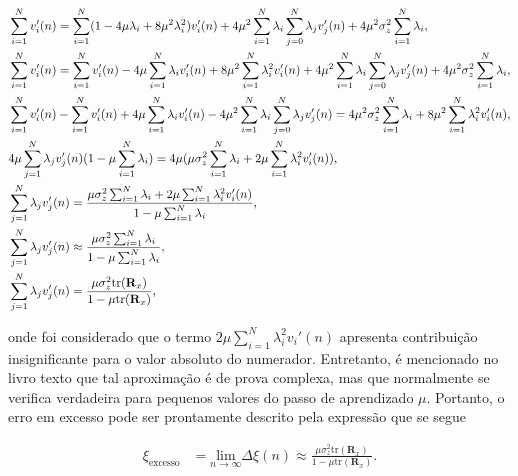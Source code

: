\documentclass[a4paper,10pt]{article}
\begin{document}
\begin{enumerate}
\begin{enumerate}
						\begin{align}
							\notag &\sum^{N}_{i = 1} v_{i}'(n) = \sum^{N}_{i = 1} (1 - 4 \mu \lambda_{i} + 8 \mu^{2} \lambda^{2}_{i}) v_{i}'(n) + 4 \mu^{2} \sum^{N}_{i = 1} \lambda_{i} \sum^{N}_{j = 0} \lambda_{j} v_{j}'(n) + 4 \mu^{2} \sigma^{2}_{z} \sum^{N}_{i = 1} \lambda_{i}, \\
							\notag &\sum^{N}_{i = 1} v_{i}'(n) = \sum^{N}_{i = 1} v_{i}'(n) - 4 \mu \sum^{N}_{i = 1} \lambda_{i} v_{i}'(n)  + 8 \mu^{2} \sum^{N}_{i = 1} \lambda^{2}_{i} v_{i}'(n) + 4 \mu^{2} \sum^{N}_{i = 1} \lambda_{i} \sum^{N}_{j = 0} \lambda_{j} v_{j}'(n) + 4 \mu^{2} \sigma^{2}_{z} \sum^{N}_{i = 1} \lambda_{i}, \\
							\notag &\sum^{N}_{i = 1} v_{i}'(n) - \sum^{N}_{i = 1} v_{i}'(n) + 4 \mu \sum^{N}_{i = 1} \lambda_{i} v_{i}'(n) - 4 \mu^{2} \sum^{N}_{i = 1} \lambda_{i} \sum^{N}_{j = 0} \lambda_{j} v_{j}'(n) = 4 \mu^{2} \sigma^{2}_{z} \sum^{N}_{i = 1} \lambda_{i} + 8 \mu^{2} \sum^{N}_{i = 1} \lambda^{2}_{i} v_{i}'(n), \\
							\notag &4 \mu \sum^{N}_{j = 1} \lambda_{j} v_{j}'(n)(1 - \mu \sum^{N}_{i = 1} \lambda_{i}) = 4 \mu (\mu \sigma^{2}_{z} \sum^{N}_{i = 1} \lambda_{i} + 2 \mu \sum^{N}_{i = 1} \lambda^{2}_{i} v_{i}'(n)), \\
							\notag &\sum^{N}_{j = 1} \lambda_{j} v_{j}'(n) = \frac{\mu \sigma^{2}_{z} \sum^{N}_{i = 1} \lambda_{i} + 2 \mu \sum^{N}_{i = 1} \lambda^{2}_{i} v_{i}'(n)}{1 - \mu \sum^{N}_{i = 1} \lambda_{i}}, \\
							\notag &\sum^{N}_{j = 1} \lambda_{j} v_{j}'(n) \approx \frac{\mu \sigma^{2}_{z} \sum^{N}_{i = 1} \lambda_{i} }{1 - \mu \sum^{N}_{i = 1} \lambda_{i}}, \\
							&\sum^{N}_{j = 1} \lambda_{j} v_{j}'(n) = \frac{\mu \sigma^{2}_{z} \text{tr}(\mathbf{R}_{x})}{1 - \mu \text{tr}(\mathbf{R}_{x})},
						\end{align}

						onde foi considerado que o termo $2 \mu \sum^{N}_{i = 1} \lambda^{2}_{i} v_{i}'(n)$ apresenta contribuição insignificante para o valor absoluto do numerador. Entretanto, é mencionado no livro texto que tal aproximação é de prova complexa, mas que normalmente 
						se verifica verdadeira para pequenos valores do passo de aprendizado $\mu$. Portanto, o erro em excesso pode ser prontamente descrito pela expressão que se segue

						\begin{align}
							\xi_{\text{excesso}} &= \underset{n \rightarrow \infty}{\text{lim}} \Delta \xi(n) \approx \frac{\mu \sigma^{2}_{z} \text{tr}(\mathbf{R}_{x})}{1 - \mu \text{tr}(\mathbf{R}_{x})}.
						\end{align}


\end{enumerate}
\end{enumerate}
\end{document}
